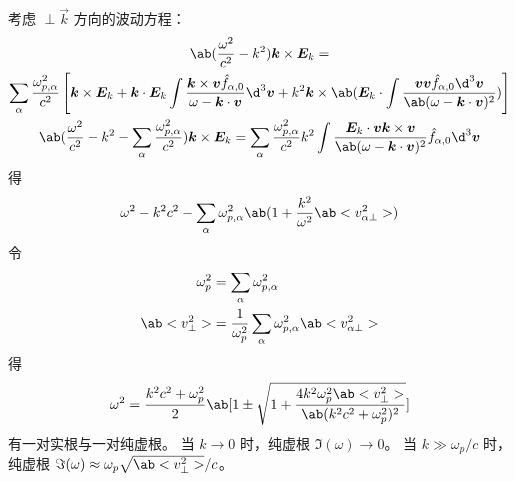 考虑 $\perp\vec{k}$ 方向的波动方程：
\begin{equation}\begin{gathered}
\ab(\frac{\omega^2}{c^2} - k^2) \vec{k}\times\vec{E}_k
= \\
\sum_\alpha \frac{\omega_{p,\alpha}^2}{c^2}
\left[ \vec{k}\times\vec{E}_k
+ \vec{k} \cdot \vec{E}_k \int
    \frac{\vec{k}\times\vec{v} \hat{f}_{\alpha,0}}
    {\omega-\vec{k}\cdot\vec{v}} \d^3\vec{v}
+ k^2 \vec{k}\times \ab(\vec{E}_k \cdot \int
    \frac{\vec{v}\vec{v} \hat{f}_{\alpha,0} \d^3\vec{v}}
    {\ab(\omega-\vec{k}\cdot\vec{v})^2})
\right] \\
\ab(\frac{\omega^2}{c^2} - k^2
- \sum_\alpha \frac{\omega_{p,\alpha}^2}{c^2})
\vec{k} \times \vec{E}_k
= \sum_\alpha \frac{\omega_{p,\alpha}^2}{c^2}k^2 \int
    \frac{\vec{E}_k \cdot \vec{v} \vec{k} \times \vec{v}}
    {\ab(\omega-\vec{k}\cdot\vec{v})^2}
\hat{f}_{\alpha,0} \d^3\vec{v}
\end{gathered}\end{equation}
得
\begin{equation}
\omega^2 - k^2 c^2 - \sum_\alpha \omega_{p,\alpha}^2 \ab(
    1 + \frac{k^2}{\omega^2} \ab<v_{\alpha\perp}^2>
)
\end{equation}
令
\begin{subequations}\begin{align}
\omega_p^2 &= \sum_\alpha \omega_{p,\alpha}^2 \\
\ab<v_\perp^2> &= \frac{1}{\omega_p^2}
    \sum_\alpha \omega_{p,\alpha}^2 \ab<v_{\alpha\perp}^2>
\end{align}\end{subequations}
得
\begin{equation}
\omega^2 = \frac{k^2 c^2 + \omega_p^2}{2} \ab[
    1 \pm \sqrt{1 + 
        \frac{4 k^2 \omega_p^2 \ab<v_\perp^2>}
        {\ab(k^2 c^2 + \omega_p^2)^2}
}]
\end{equation}
有一对实根与一对纯虚根。
当 $k \to 0$ 时，纯虚根 $\Im(\omega) \to 0$。
当 $k \gg \omega_p/c$ 时，纯虚根 $\Im(\omega) \approx \omega_p \sqrt{\ab<v_\perp^2>}/c$。
